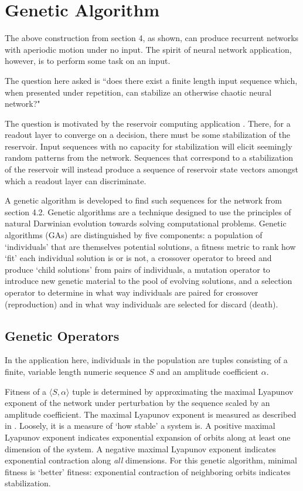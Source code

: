 \documentclass[12pt]{article}
\begin{document}
\section{Genetic Algorithm}
The above construction from section 4, as shown, can produce recurrent
networks with
aperiodic motion under no input.  The spirit of neural network application,
however, is to perform some task on an input.

The question here asked is ``does there exist a finite length input sequence
which, when presented under repetition, can stabilize an otherwise chaotic
neural network?"

The question is motivated by the reservoir computing application
\cite{jaeger_original, maass_original}.  There, for a readout
layer to converge on a decision, there must be some stabilization of the
reservoir.  Input sequences with no capacity for stabilization will
elicit seemingly random patterns from the network.  Sequences that
correspond to a stabilization of the reservoir will instead produce a sequence
of reservoir state vectors amongst which a readout layer can discriminate.

A genetic algorithm is developed to find such sequences for the network from
section 4.2.  Genetic algorithms are a technique designed to use
the principles of natural Darwinian evolution towards solving computational
problems.  Genetic algorithms (GAs) are distinguished by five components:  a
population of `individuals' that are themselves potential solutions, a fitness
metric to rank how `fit' each individual solution is or is not, a crossover
operator to breed and produce `child solutions' from pairs of individuals,
a mutation operator to introduce new genetic material to the pool of
evolving solutions, and a selection operator to determine in what way
individuals are paired for crossover (reproduction) and in what way 
individuals are selected for discard (death).

\subsection{Genetic Operators}
In the application here, individuals in the population are
tuples consisting of a finite, variable length numeric sequence $S$ and an
amplitude coefficient $\alpha$.

Fitness of a $\langle S, \alpha \rangle$ tuple is determined by
approximating the maximal Lyapunov exponent of the network
under perturbation by the sequence scaled
by an amplitude coefficient.  The maximal Lyapunov exponent is
measured as described in \cite{sprott}.  Loosely, it is a measure of `how
stable' a system is.  A positive maximal Lyapunov exponent indicates exponential
expansion of orbits along at least one dimension of the system.  A negative
maximal Lyapunov exponent indicates exponential contraction along \textit{all}
dimensions.  For this genetic algorithm, minimal fitness
is `better' fitness: exponential contraction of neighboring orbits indicates
stabilization.
\end{document}
